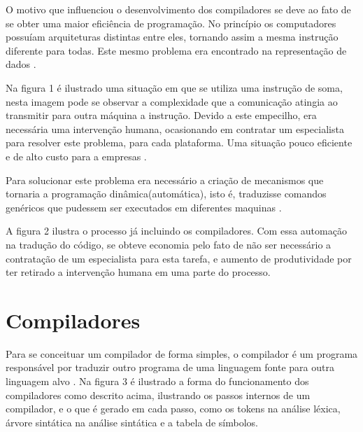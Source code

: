 \documentclass[12pt,oneside,a4paper,chapter=TITLE,section=TITLE,sumario=tradicional]{abntex2}
\begin{document}
O motivo que influenciou o desenvolvimento dos compiladores se deve ao fato de se obter uma maior eficiência de programação. No princípio os computadores possuíam arquiteturas distintas entre eles, tornando assim a mesma instrução diferente para todas. Este mesmo problema era encontrado na representação de dados \cite{ricarte2008}.

Na figura 1 é ilustrado uma situação em que se utiliza uma instrução de soma, nesta imagem pode se observar a complexidade que a comunicação atingia ao transmitir para outra máquina a instrução. Devido a este empecilho, era necessária uma intervenção humana, ocasionando em contratar um especialista para resolver este problema, para cada plataforma. Uma situação pouco eficiente e de alto custo para a empresas  \cite{ricarte2008}.

\begin{figure}[htb]
\end{figure}
Para solucionar este problema era necessário a criação de mecanismos que tornaria a programação dinâmica(automática), isto é, traduzisse comandos genéricos que pudessem ser executados em diferentes maquinas \cite{ricarte2008}.

A figura 2 ilustra o processo já incluindo os compiladores. Com essa automação na tradução do código, se obteve economia pelo fato de não ser necessário a contratação de um especialista para esta tarefa, e aumento de produtividade por ter retirado a intervenção humana em uma parte do processo. 

\begin{figure}[htb]
\end{figure}

\section{Compiladores}
\label{sec:compiladores}

Para se conceituar um compilador de forma simples, o compilador é um programa responsável por traduzir outro programa de uma linguagem fonte para outra linguagem alvo \cite{alfred1995}. Na figura 3 é ilustrado a forma do funcionamento dos compiladores como descrito acima, ilustrando os passos internos de um compilador, e o que é gerado em cada passo, como os tokens na análise léxica, árvore sintática na análise sintática e a tabela de símbolos.
\end{document}
